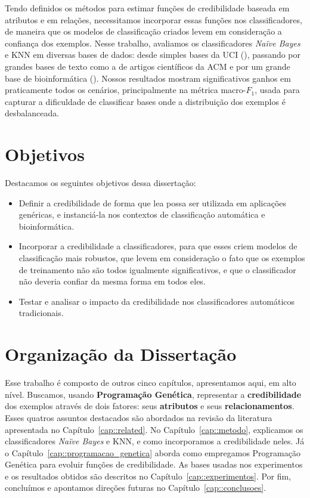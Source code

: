 Tendo definidos os métodos para estimar funções de credibilidade baseada em atributos e em relações, necessitamos incorporar essas funções nos classificadores, de maneira que os modelos de classificação criados levem em consideração a confiança dos exemplos. Nesse trabalho, avaliamos os classificadores \textit{Naïve Bayes} e \textsc{KNN} em diversas bases de dados: desde simples bases da \textsc{UCI} (\cite{UCI98}), passando por grandes bases de texto como a de artigos científicos da \textsc{ACM} e por um grande base de bioinformática (\cite{dpires_bmc_2011}).
Nossos resultados mostram significativos ganhos em praticamente todos os cenários, principalmente na métrica macro-$F_1$, usada para capturar a dificuldade de classificar bases onde a distribuição dos exemplos é desbalanceada.


\section{Objetivos}

Destacamos os seguintes objetivos dessa dissertação:

\begin{itemize}
 
\item Definir a credibilidade de forma que lea possa ser utilizada em aplicações genéricas, e instanciá-la nos contextos de classificação automática e bioinformática.
\item Incorporar a credibilidade a classificadores, para que esses criem modelos de classificação mais robustos, que levem em consideração o fato que os exemplos de treinamento não são todos igualmente significativos, e que o classificador não deveria confiar da mesma forma em todos eles. 
\item Testar e analisar o impacto da credibilidade nos classificadores automáticos tradicionais.

\end{itemize}

\section{Organização da Dissertação}

Esse trabalho é composto de outros cinco capítulos, apresentamos aqui, em alto nível.
Buscamos, usando \textbf{Programação Genética}, representar a \textbf{credibilidade} dos exemplos através de dois fatores: seus \textbf{atributos} e seus \textbf{relacionamentos}.
Esses quatros assuntos destacados são abordados na revisão da literatura apresentada no Capítulo~\ref{cap::related}.
No Capítulo~\ref{cap::metodo}, explicamos os classificadores \textit{Naïve Bayes} e \textsc{KNN}, e como incorporamos a credibilidade neles.
Já o Capítulo~\ref{cap::programacao_genetica} aborda como empregamos Programação Genética para evoluir funções de credibilidade.
As bases usadas nos experimentos e os resultados obtidos são descritos no Capítulo~\ref{cap::experimentos}. Por fim, concluímos e apontamos direções futuras no Capítulo~\ref{cap::conclusoes}.


